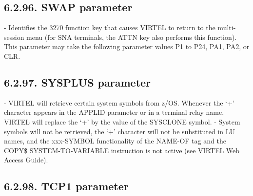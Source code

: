 \documentclass[letterpaper,10pt,english]{sphinxmanual}
\begin{document}
\subsection{6.2.96. SWAP parameter}
\label{\detokenize{Installation_Guide:swap-parameter}}
\begin{sphinxVerbatim}[commandchars=\\\{\}]
 
\end{sphinxVerbatim}

 - Identifies the 3270 function key that causes VIRTEL to return to the multi-session menu (for SNA terminals, the ATTN key also performs this function). This parameter may take the following parameter values P1 to P24, PA1, PA2, or CLR.


\subsection{6.2.97. SYSPLUS parameter}
\label{\detokenize{Installation_Guide:sysplus-parameter}}
\begin{sphinxVerbatim}[commandchars=\\\{\}]
 
\end{sphinxVerbatim}

 - VIRTEL will retrieve certain system symbols from z/OS. Whenever the ‘+’ character appears in the APPLID parameter or in a terminal relay name, VIRTEL will replace the ‘+’ by the value of the SYSCLONE symbol.
 - System symbols will not be retrieved, the ‘+’ character will not be substituted in LU names, and the xxx-SYMBOL functionality of the NAME-OF tag and the COPY\$ SYSTEM-TO-VARIABLE instruction is not active (see VIRTEL Web Access Guide).


\subsection{6.2.98. TCP1 parameter}
\label{\detokenize{Installation_Guide:tcp1-parameter}}
\begin{sphinxVerbatim}[commandchars=\\\{\}]
   
\PYG{p}{[}\PYG{p}{]}\PYG{p}{[}\PYG{p}{]}\PYG{p}{[}\PYG{p}{]}\PYG{p}{[}\PYG{p}{]}
\end{sphinxVerbatim}
\end{document}
